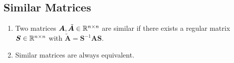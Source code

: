 \subsection{Similar Matrices}

\begin{enumerate}
    \item
    \begin{definition}
        Two matrices $\bm{A}, \tilde{\bm{A}} \in \mathbb{R}^{n\times n}$ are similar if there exists a regular matrix $\bm{S} \in \mathbb{R}^{n\times n}$ with $\tilde{\bm{A}} = \bm{S} ^{-1}\bm{AS}$.
        \hfill \cite{mfml/book/mml/Deisenroth-Faisal-Ong}
    \end{definition}

    \item Similar matrices are always equivalent.
    \hfill \cite{mfml/book/mml/Deisenroth-Faisal-Ong}
\end{enumerate}







